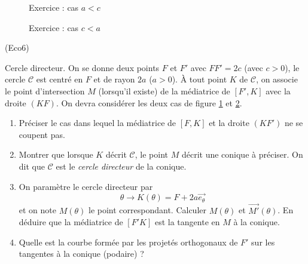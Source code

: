 \begin{figure}[ht]
 \centering
 
 \caption{Exercice  : cas $a<c$}
 \label{fig:Eco6_1}
\end{figure}
\begin{figure}[ht]
 \centering
 
 \caption{Exercice  : cas $c<a$}
 \label{fig:Eco6_2}
\end{figure}

\begin{tiny}(Eco6)\end{tiny} Cercle directeur.\newline
On se donne deux points $F$ et $F'$ avec $FF'=2c$ (avec $c>0$), le cercle $\mathcal C$ est centré en $F$ et de rayon $2a$ ($a>0$).\newline
\`A tout point $K$ de $\mathcal C$, on associe le point d'intersection $M$ (lorsqu'il existe) de la médiatrice de $[F',K]$ avec la droite $(KF)$. On devra considérer les deux cas de figure \ref{fig:Eco6_1} et \ref{fig:Eco6_2}.
\begin{enumerate}
 \item Préciser le cas dans lequel la médiatrice de $[F,K]$ et la droite $(KF')$ ne se coupent pas.
 \item Montrer que lorsque $K$ décrit $\mathcal C$, le point $M$ décrit une conique à préciser. On dit que $\mathcal C$ est le \emph{cercle directeur} de la conique.
 \item On paramètre le cercle directeur par 
\begin{displaymath}
 \theta \rightarrow K(\theta) = F +2a\overrightarrow{e_\theta}
\end{displaymath}
et on note $M(\theta)$ le point correspondant. Calculer $M(\theta)$ et $\overrightarrow {M'} (\theta)$. En déduire que la médiatrice de $[F'K]$ est la tangente en $M$ à la conique.
\item Quelle est la courbe formée par les projetés orthogonaux de $F'$ sur les tangentes à la conique (podaire) ?
\end{enumerate}
